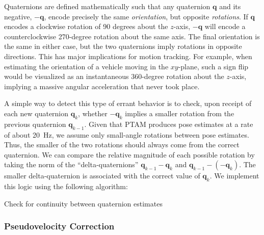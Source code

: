 Quaternions are defined mathematically such that any quaternion $\mathbf{q}$ and its negative, $- \mathbf{q}$, encode precisely the same \textit{orientation}, but opposite \textit{rotations}. If $\mathbf{q}$ encodes a clockwise rotation of 90 degrees about the $z$-axis, $- \mathbf{q}$ will encode a counterclockwise 270-degree rotation about the same axis. The final orientation is the same in either case, but the two quaternions imply rotations in opposite directions. This has major implications for motion tracking. For example, when estimating the orientation of a vehicle moving in the $xy$-plane, such a sign flip would be visualized as an instantaneous 360-degree rotation about the $z$-axis, implying a massive angular acceleration that never took place. 

A simple way to detect this type of errant behavior is to check, upon receipt of each new quaternion $\mathbf{q}_{k}$, whether $- \mathbf{q}_{k}$ implies a smaller rotation from the previous quaternion $\mathbf{q}_{k-1}$. Given that PTAM produces pose estimates at a rate of about 20~Hz, we assume only small-angle rotations between pose estimates. Thus, the smaller of the two rotations should always come from the correct quaternion. We can compare the relative magnitude of each possible rotation by taking the norm of the ``delta-quaternions'' $\mathbf{q}_{k-1} - \mathbf{q}_{k}$ and $\mathbf{q}_{k-1} - \left( - \mathbf{q}_{k} \right)$. The smaller delta-quaternion is associated with the correct value of $\mathbf{q}_{k}$. We implement this logic using the following algorithm:

\begin{algorithm}
  \caption{Check for continuity between quaternion estimates}
    \label{alg:checkQuatContinuity}
\end{algorithm}

\subsubsection{Pseudovelocity Correction}

